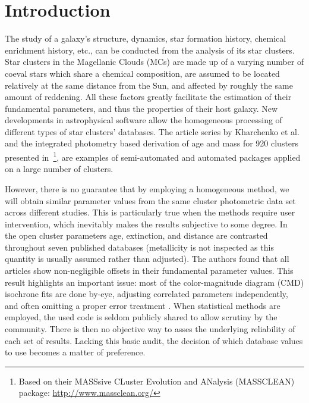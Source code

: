 \documentclass{aa}
\begin{document}

\maketitle
%

\section{Introduction}
\label{sec:intro}

The study of a galaxy's structure, dynamics, star formation history, chemical
enrichment history, etc., can be conducted from the analysis of its star
clusters.
Star clusters in the Magellanic Clouds (MCs) are made up of a varying number of
coeval stars which share a chemical composition, are assumed to be located
relatively at the same distance from the Sun, and affected by roughly the same
amount of reddening. All these factors greatly facilitate the estimation of
their fundamental parameters, and thus the properties of their host galaxy.
%
New developments in astrophysical software allow the homogeneous
processing of different types of star clusters' databases. The article series
by Kharchenko et al. 
\citep[see][and references therein]{Kharchenko_2005,Schmeja_2014}
and the integrated photometry based derivation of age and mass for 920 clusters
presented
in~\cite{Popescu_2012}\footnote{Based on their MASSsive CLuster Evolution and
ANalysis (MASSCLEAN) package: \url{http://www.massclean.org/}}, are examples of
semi-automated and automated packages applied on a large number of clusters.

However, there is no guarantee that by employing a homogeneous method, we will
obtain similar parameter values from the same cluster photometric
data set across different studies. This is particularly true when the methods
require user intervention, which inevitably makes the results subjective to some
degree.
%
In~\cite{Netopil_2015} the open cluster parameters age, extinction, and distance
are contrasted throughout seven published databases (metallicity is not
inspected as this quantity is usually assumed rather than adjusted).
The authors found that all articles show non-negligible offsets in their
fundamental parameter values.
%
This result highlights an important issue: most of the color-magnitude diagram 
(CMD) isochrone fits are done by-eye, adjusting correlated parameters
independently, and often omitting a proper error treatment \citep[see]
[for a more detailed description of this problem]{vonHippel_2014}.
When statistical methods are employed, the used code is seldom publicly
shared to allow scrutiny by the community. There is then no objective way to
asses the underlying reliability of each set of results.
Lacking this basic audit, the decision of which database values to use
becomes a matter of preference.
\end{document}
